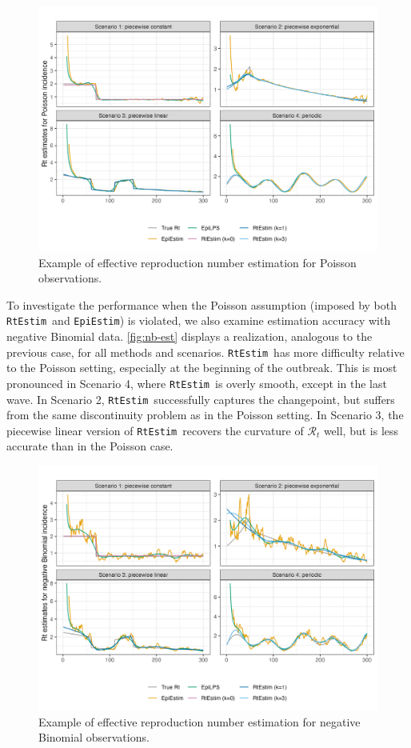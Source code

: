 \documentclass[10pt,letterpaper]{article}
\def\RtEstim{\texttt{RtEstim}}
\def\EpiEstim{\texttt{EpiEstim}}
\def\calR{\mathcal{R}}
\begin{document}
\begin{figure}[!ht]
  \centering
  \includegraphics[width=.99\textwidth]{fig/Pois-res-plot.png}
  \caption{Example of effective reproduction number estimation for Poisson observations.}
  \label{fig:pois-est}
\end{figure}

To investigate the performance when the Poisson assumption (imposed by both
\RtEstim\ and \EpiEstim) is violated, we also examine estimation accuracy with
negative Binomial data. \autoref{fig:nb-est} displays a realization, analogous
to the previous case, for all methods and scenarios. \RtEstim\ has more
difficulty relative to the Poisson setting, especially at the beginning of the
outbreak. This is most pronounced in Scenario 4, where \RtEstim\ is overly
smooth, except in the last wave. In Scenario 2, \RtEstim\ successfully captures
the changepoint, but suffers from the same discontinuity problem as in the
Poisson setting. In Scenario 3, the piecewise linear version of \RtEstim\
recovers the curvature of $\calR_t$ well, but is less accurate than in the
Poisson case.

\begin{figure}[!ht]
  \centering
  \includegraphics*[width=.99\textwidth]{fig/NB-res-plot.png}
  \caption{Example of effective reproduction number estimation for negative
  Binomial observations.}
  \label{fig:nb-est}
\end{figure}
\end{document}

